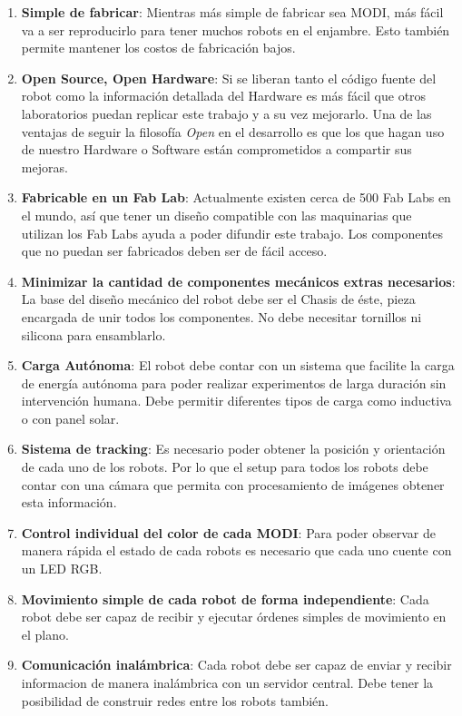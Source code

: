 \begin{enumerate}
\item \textbf{Simple de fabricar}: Mientras más simple de fabricar sea MODI, más fácil va a ser reproducirlo para tener muchos robots en el enjambre. Esto también permite mantener los costos de fabricación bajos. 
\item \textbf{Open Source, Open Hardware}: Si se liberan tanto el código fuente del robot como la información detallada del Hardware es más fácil que otros laboratorios puedan replicar este trabajo y a su vez mejorarlo. Una de las ventajas de seguir la filosofía \textit{Open} en el desarrollo es que los que hagan uso de nuestro Hardware o Software están comprometidos a compartir sus mejoras.
\item \textbf{Fabricable en un Fab Lab}: Actualmente existen cerca de 500 Fab Labs en el mundo, así que tener un diseño compatible con las maquinarias que utilizan los Fab Labs ayuda a poder difundir este trabajo. Los componentes que no puedan ser fabricados deben ser de fácil acceso.
\item \textbf{Minimizar la cantidad de componentes mecánicos extras necesarios}: La base del diseño mecánico del robot debe ser el Chasis de éste, pieza encargada de unir todos los componentes. No debe necesitar tornillos ni silicona para ensamblarlo.
\item \textbf{Carga Autónoma}: El robot debe contar con un sistema que facilite la carga de energía autónoma para poder realizar experimentos de larga duración sin intervención humana. Debe permitir diferentes tipos de carga como inductiva o con panel solar.
\item \textbf{Sistema de tracking}: Es necesario poder obtener la posición y orientación de cada uno de los robots. Por lo que el setup para todos los robots debe contar con una cámara que permita con procesamiento de imágenes obtener esta información.
\item \textbf{Control individual del color de cada MODI}: Para poder observar de manera rápida el estado de cada robots es necesario que cada uno cuente con un LED RGB.
\item \textbf{Movimiento simple de cada robot de forma independiente}: Cada robot debe ser capaz de recibir y ejecutar órdenes simples de movimiento en el plano.
\item \textbf{Comunicación inalámbrica}: Cada robot debe ser capaz de enviar y recibir informacion de manera inalámbrica con un servidor central. Debe tener la posibilidad de construir redes entre los robots también.
\end{enumerate}

